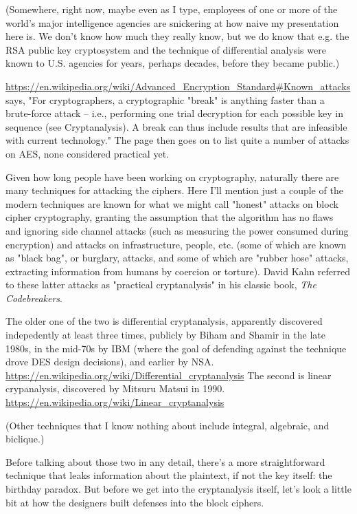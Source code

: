 \documentclass[%
 aip,
 jmp,%
 amsmath,amssymb,
 reprint,%
]{revtex4-1}
\begin{document}
(Somewhere, right now, maybe even as I type, employees of one or more
of the world's major intelligence agencies are snickering at how naive
my presentation here is.  We don't know how much they really know, but
we do know that e.g. the RSA public key cryptosystem and the technique
of differential analysis were known to U.S. agencies for years,
perhaps decades, before they became public.)

\url{https://en.wikipedia.org/wiki/Advanced_Encryption_Standard#Known_attacks}
says, "For cryptographers, a cryptographic "break" is anything faster
than a brute-force attack – i.e., performing one trial decryption for
each possible key in sequence (see Cryptanalysis). A break can thus
include results that are infeasible with current technology."
The page then goes on to list quite a number of attacks on AES, none
considered practical yet.

Given how long people have been working on cryptography, naturally
there are many techniques for attacking the ciphers.  Here I'll
mention just a couple of the modern techniques are known for what we
might call "honest" attacks on block cipher cryptography, granting the
assumption that the algorithm has no flaws and ignoring side channel
attacks (such as measuring the power consumed during encryption) and
attacks on infrastructure, people, etc. (some of which are known as
"black bag", or burglary, attacks, and some of which are "rubber hose"
attacks, extracting information from humans by coercion or torture).
David Kahn referred to these latter attacks as "practical
cryptanalysis" in his classic book, \emph{The Codebreakers}.

The older one of the two is differential cryptanalysis, apparently
discovered indepedently at least three times, publicly by Biham and
Shamir in the late 1980s, in the mid-70s by IBM (where the goal of
defending against the technique drove DES design decisions), and
earlier by NSA.
\url{https://en.wikipedia.org/wiki/Differential_cryptanalysis}
The second is linear crypanalysis, discovered by Mitsuru Matsui in
1990.
\url{https://en.wikipedia.org/wiki/Linear_cryptanalysis}

(Other techniques that I know nothing about include integral,
algebraic, and biclique.)

Before talking about those two in any detail, there's a more
straightforward technique that leaks information about the plaintext,
if not the key itself: the birthday paradox.  But before we get into
the cryptanalysis itself, let's look a little bit at how the designers
built defenses into the block ciphers.
\end{document}
